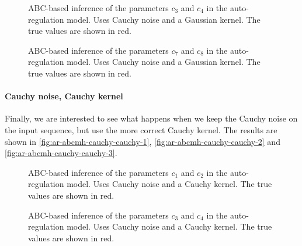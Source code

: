 \begin{figure}[htp]%
    \centering
    \qquad
    \caption{ABC-based inference of the parameters $c_3$ and $c_4$ in the auto-regulation model. Uses Cauchy noise and a Gaussian kernel. The true values are shown in red.}%
    \label{fig:ar-abcmh-cauchy-gauss-2}%
\end{figure}

\begin{figure}[htp]%
    \centering
    \qquad
    \caption{ABC-based inference of the parameters $c_7$ and $c_8$ in the auto-regulation model. Uses Cauchy noise and a Gaussian kernel. The true values are shown in red.}%
    \label{fig:ar-abcmh-cauchy-gauss-3}%
\end{figure}

\paragraph{Cauchy noise, Cauchy kernel}
Finally, we are interested to see what happens when we keep the Cauchy noise on the input sequence, but use the more correct Cauchy kernel. The results are shown in \autoref{fig:ar-abcmh-cauchy-cauchy-1}, \autoref{fig:ar-abcmh-cauchy-cauchy-2} and \autoref{fig:ar-abcmh-cauchy-cauchy-3}.

\begin{figure}[htp]%
    \centering
    \qquad
    \caption{ABC-based inference of the parameters $c_1$ and $c_2$ in the auto-regulation model. Uses Cauchy noise and a Cauchy kernel. The true values are shown in red.}%
    \label{fig:ar-abcmh-cauchy-cauchy-1}%
\end{figure}

\begin{figure}[htp]%
    \centering
    \qquad
    \caption{ABC-based inference of the parameters $c_3$ and $c_4$ in the auto-regulation model. Uses Cauchy noise and a Cauchy kernel. The true values are shown in red.}%
    \label{fig:ar-abcmh-cauchy-cauchy-2}%
\end{figure}

